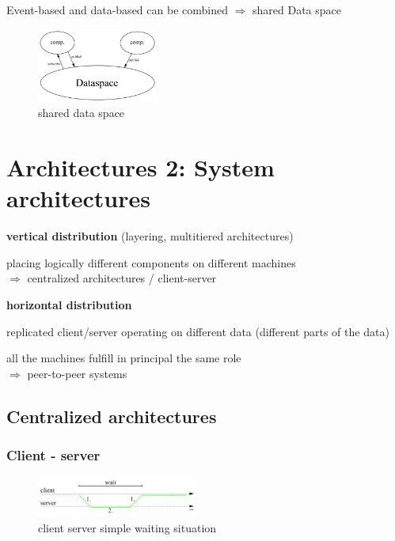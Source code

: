 \documentclass[ngerman,a4paper]{report}
\begin{document}
Event-based and data-based can be combined $\Rightarrow$ shared Data space
\begin{figure}[h]
	\centering
	\includegraphics[width=150px]{gfx/shared_data_space.png}
	\caption{shared data space}
	\label{img:shared_data_space}
\end{figure}

\chapter{Architectures 2: System architectures}

\begin{compactitem}
\item \textbf{vertical distribution} (layering, multitiered architectures)
	\begin{compactitem}
		\item placing logically different components on different machines\\
		$\Rightarrow$ centralized architectures / client-server
	\end{compactitem}
	\item \textbf{horizontal distribution}
	\begin{compactitem}
		\item replicated client/server operating on different data (different parts of the data)
		\item all the machines fulfill in principal the same role\\
		$\Rightarrow$ peer-to-peer systems
	\end{compactitem}
\end{compactitem}

\section{Centralized architectures}

\subsection{Client - server}

\begin{figure}[h]
	\centering
	\includegraphics[width=200px]{gfx/cs_simple_wait.png}
	\caption{client server simple waiting situation}
	\label{img:cs_simple_wait}
\end{figure}
\end{document}
